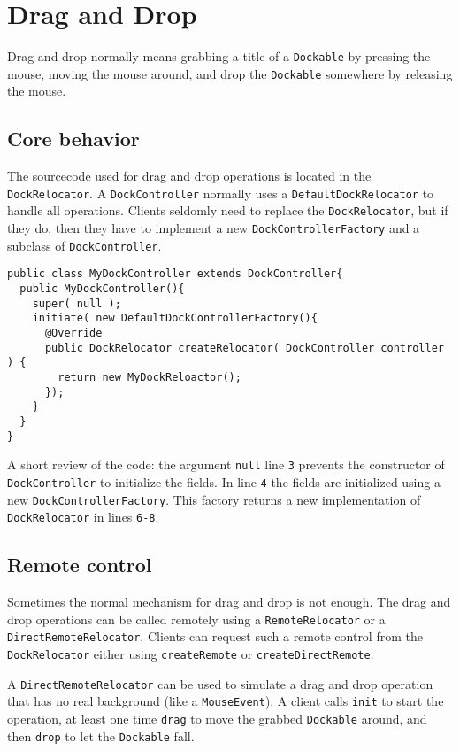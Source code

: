 \documentclass[a4paper,10pt]{article}
\newcommand{\src}[1]{\lstinline[basicstyle=\normalsize\ttfamily,keywordstyle=\normalsize\ttfamily,identifierstyle=\normalsize\ttfamily]|#1|}
\begin{document}
\section{Drag and Drop}
Drag and drop normally means grabbing a title of a \src{Dockable} by pressing the mouse, moving the mouse around, and drop the \src{Dockable} somewhere by releasing the mouse.
\subsection{Core behavior}
The sourcecode used for drag and drop operations is located in the \\\src{DockRelocator}. A \src{DockController} normally uses a \src{DefaultDockRelocator} to handle all operations. Clients seldomly need to replace the \src{DockRelocator}, but if they do, then they have to implement a new \src{DockControllerFactory} and a subclass of \src{DockController}.
\begin{lstlisting}
public class MyDockController extends DockController{
  public MyDockController(){	
    super( null );
    initiate( new DefaultDockControllerFactory(){
      @Override
      public DockRelocator createRelocator( DockController controller ) {
        return new MyDockReloactor();
      });
    }
  }
}
\end{lstlisting}
A short review of the code: the argument \src{null} line \src{3} prevents the constructor of \src{DockController} to initialize the fields. In line \src{4} the fields are initialized using a new \src{DockControllerFactory}. This factory returns a new implementation of \src{DockRelocator} in lines \src{6-8}.

\subsection{Remote control}
Sometimes the normal mechanism for drag and drop is not enough. The drag and drop operations can be called remotely using a \src{RemoteRelocator} or a \src{DirectRemoteRelocator}. Clients can request such a remote control from the \src{DockRelocator} either using \src{createRemote} or \src{createDirectRemote}.

A \src{DirectRemoteRelocator} can be used to simulate a drag and drop operation that has no real background (like a \src{MouseEvent}). A client calls \src{init} to start the operation, at least one time \src{drag} to move the grabbed \src{Dockable} around, and then \src{drop} to let the \src{Dockable} fall.
\end{document}
